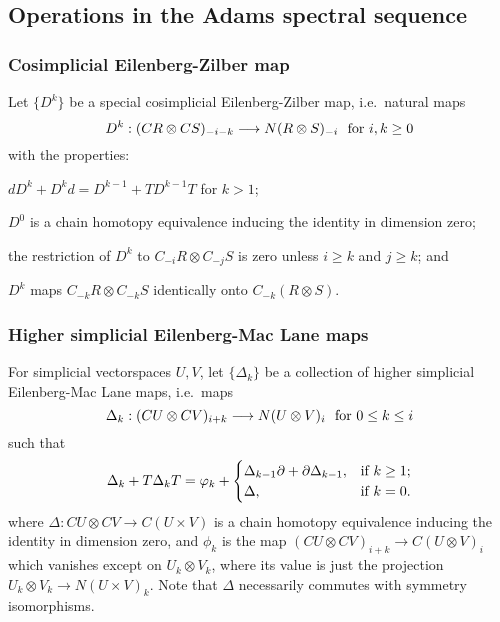 \documentclass[10pt]{article}
\begin{document}
\begin{letter to Dwyer}
\section{Operations in the Adams spectral sequence}
\subsubsection*{Cosimplicial Eilenberg-Zilber map}
Let $\{D^k\}$ be a special cosimplicial Eilenberg-Zilber map, i.e.\ natural maps
\[D^k:(CR\otimes CS)_{-i-k}\to N(R\otimes S)_{-i}\textup{\ \ for $i,k\geq0$}\]
with the properties:
\begin{itemise}
\setlength{\parindent}{.25in}
\item $dD^k+D^kd=D^{k-1}+TD^{k-1}T$ for $k>1$;
\item $D^0$ is a chain homotopy equivalence inducing the identity in dimension zero;
\item the restriction of $D^k$ to $C_{-i}R\otimes C_{-j}S$ is zero unless $i\geq k$ and $j\geq k$; and
\item $D^k$ maps $C_{-k}R\otimes C_{-k}S$ identically onto $C_{-k}(R\otimes S)$.
\end{itemise}
\subsubsection*{Higher simplicial Eilenberg-Mac Lane maps}
For simplicial vectorspaces $U,V$, let $\{\Delta_k\}$ be a collection of higher simplicial Eilenberg-Mac Lane maps, i.e.\ maps
\[\Delta_k:(CU\otimes CV)_{i+k}\to N(U\otimes V)_i\textup{\ \ for $0\leq k\leq i$}\]
such that
\[\Delta_k+T\Delta_kT=\phi_k+\begin{cases}
\Delta_{k-1}\partial+\partial\Delta_{k-1},&\textup{if }k\geq1;\\
\Delta,&\textup{if }k=0.
\end{cases}
\]
where $\Delta:CU\otimes CV\to C(U\times V)$ is a chain homotopy equivalence inducing the identity in dimension zero, and $\phi_k$ is the map $(CU\otimes CV)_{i+k}\to C(U\otimes V)_i$ which vanishes except on $U_k\otimes V_k$, where its value is just the projection $U_k\otimes V_k\to N(U\times V)_k$. Note that $\Delta$ necessarily commutes with symmetry isomorphisms.


\end{letter to Dwyer}
\end{document}
